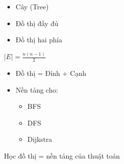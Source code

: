 \documentclass{beamer}
\newcommand{\hlblue}[1]{\textcolor{myblue}{#1}}
\newcommand{\hlred}[1]{\textcolor{myred}{#1}}
\newcommand{\hlpurple}[1]{\textcolor{mypurple}{#1}}
\begin{document}

\begin{frame}{}
\begin{itemize}
\item \hlblue{Cây (Tree)}
\item \hlblue{Đồ thị đầy đủ}
\item \hlblue{Đồ thị hai phía}
\end{itemize}

\begin{tcolorbox}
\centering
\hlpurple{$|E| = \frac{n(n-1)}{2}$}
\end{tcolorbox}
\end{frame}


\begin{frame}{}
\begin{itemize}
\item Đồ thị = \hlblue{Đỉnh + Cạnh}
\item Nền tảng cho:
\begin{itemize}
\item BFS
\item DFS
\item Dijkstra
\end{itemize}
\end{itemize}

\begin{tcolorbox}
\centering
\hlred{Học đồ thị = nền tảng của thuật toán}
\end{tcolorbox}
\end{frame}
\end{document}
